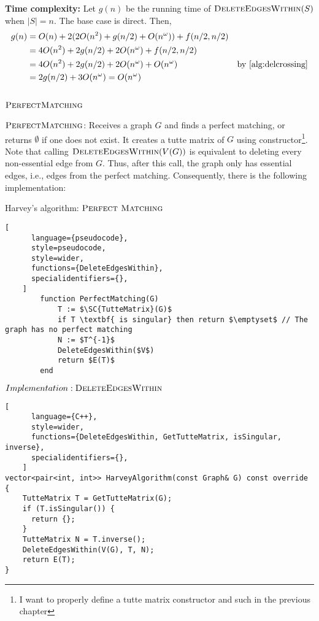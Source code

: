 \textbf{Time complexity:} 
Let \(g(n)\) be the running time of \(\textsc{DeleteEdgesWithin}(S)\) when \(|S| = n\).
The base case is direct.
Then, 
\begin{align}
    g(n) &= O(n) + 2 (2O(n^2) + g(n / 2) + O(n^\omega)) + f(n / 2, n / 2) &  \\
    &= 4O(n^2) + 2g(n / 2) + 2O(n^\omega) + f(n / 2, n / 2) & \\ 
    &= 4O(n^2) + 2g(n / 2) + 2O(n^\omega) + O(n^\omega) & \text{by \ref{alg:delcrossing}} \\ 
    &= 2g(n / 2) + 3O(n^\omega) = O(n^\omega) & \label{alg:delwithin}
\end{align}

\subsection{\(\SC{PerfectMatching}\)}

\(\SC{PerfectMatching}\): Receives a graph \(G\) and finds a perfect matching, or returns \(\emptyset\) if one does not exist.
It creates a tutte matrix of \(G\) using constructor\footnote{I want to properly define a tutte matrix constructor and such in the previous chapter}.
Note that calling \(\textsc{DeleteEdgesWithin}(V(G))\) is equivalent to deleting every non-essential edge from \(G\).
Thus, after this call, the graph only has essential edges, i.e., edges from the perfect matching. 
Consequently, there is the following implementation:

\begin{programruledcaption}{Harvey's algorithm: \(\SC{Perfect Matching}\)}
    \begin{lstlisting}[
      language={pseudocode},
      style=pseudocode,
      style=wider,
      functions={DeleteEdgesWithin},
      specialidentifiers={},
    ]
        function PerfectMatching(G)
            T := $\SC{TutteMatrix}(G)$
            if T \textbf{ is singular} then return $\emptyset$ // The graph has no perfect matching
            N := $T^{-1}$
            DeleteEdgesWithin($V$)
            return $E(T)$
        end
    \end{lstlisting}
\end{programruledcaption}

\begin{programruledcaption}{\(Implementation: \textsc{DeleteEdgesWithin}\)}
    \begin{lstlisting}[
      language={C++},
      style=wider,
      functions={DeleteEdgesWithin, GetTutteMatrix, isSingular, inverse},
      specialidentifiers={},
    ]
vector<pair<int, int>> HarveyAlgorithm(const Graph& G) const override {
    TutteMatrix T = GetTutteMatrix(G);
    if (T.isSingular()) {
      return {};
    }
    TutteMatrix N = T.inverse();
    DeleteEdgesWithin(V(G), T, N);
    return E(T);
}
    \end{lstlisting}
\end{programruledcaption}

